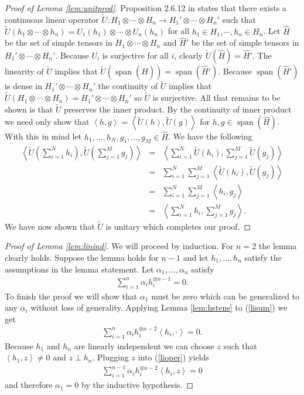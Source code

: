 \documentclass[aos]{imsart}
\def\l{\left}
\def\r{\right}
\def\span{\operatorname{span}}
\def\span{\operatorname{span}}
\theoremstyle{plain}
\theoremstyle{defintion}
\begin{document}
	\begin{proof}[Proof of Lemma \ref{lem:unitprod}]
		Proposition 2.6.12 in \cite{kadison83} states that there exists a continuous linear operator $\tilde{U}:H_1 \otimes \cdots \otimes H_n \to H_1' \otimes \cdots \otimes H_n'$ such that $\tilde{U}\left( h_1 \otimes\cdots \otimes h_n \right) = U_1(h_1) \otimes \cdots \otimes U_n(h_n)$ for all $h_1 \in H_1 ,\cdots, h_n \in H_n$. Let $\widehat{H}$ be the set of simple tensors in $H_1 \otimes \cdots \otimes H_n$ and $\widehat{H}'$ be the set of simple tensors in $H_1'\otimes \cdots \otimes H_n'$. Because $U_i$ is surjective for all $i$, clearly $\tilde{U}(\widehat{H}) = \widehat{H}'$. The linearity of $\tilde{U}$ implies that $\tilde{U}(\span(\widehat{H}))= \span(\widehat{H}')$. Because $\span(\widehat{H}')$ is dense in $H_1'\otimes \cdots \otimes H_n'$ the continuity of $\tilde{U}$ implies that $\tilde{U}(H_1\otimes\cdots \otimes H_n) = H_1'\otimes \cdots \otimes H_n'$ so $\tilde{U}$ is surjective. All that remains to be shown is that $\tilde{U}$ preserves the inner product. By the continuity of inner product we need only show that $\l<h, g\r>=\l<\tilde{U}(h), \tilde{U}(g)\r>$ for $h,g \in \span(\widehat{H})$. With this in mind let $h_1,\ldots, h_N,g_1,\ldots,g_M \in \widehat{H}$. We have the following
		\begin{eqnarray*}
			\l<\tilde{U}\l(\sum_{i=1}^N h_i\r),\tilde{U}\l(\sum_{j=1}^M g_j\r) \r>
			&=& \l<\sum_{i=1}^N \tilde{U}\l(h_i\r),\sum_{j=1}^M \tilde{U}\l(g_j\r) \r>\\
		 &=& \sum_{i=1}^N\sum_{j=1}^M\l< \tilde{U}\l(h_i\r), \tilde{U}\l(g_j\r) \r>\\
		 &=& \sum_{i=1}^N\sum_{j=1}^M\l< h_i, g_j \r>\\
		 &=& \l< \sum_{i=1}^Nh_i, \sum_{j=1}^M g_j \r>.
		\end{eqnarray*}
		We have now shown that $\tilde{U}$ is unitary which completes our proof.
	\end{proof}
	\begin{proof}[Proof of Lemma \ref{lem:linind}]
		We will proceed by induction. For $n=2$ the lemma clearly holds. Suppose the lemma holds for $n-1$ and let $h_1,\ldots, h_n$ satisfy the assumptions in the lemma statement. Let $\alpha_1,\ldots, \alpha_n$ satisfy
		\begin{eqnarray}
			\sum_{i=1}^n \alpha_i h_i^{\otimes n-1}  = 0. \label{lisum}
		\end{eqnarray}
		To finish the proof we will show that $\alpha_1$ must be zero which can be generalized to any $\alpha_i$ without loss of generality.
		Applying Lemma \ref{lem:hstens} to (\ref{lisum}) we get
		\begin{eqnarray}
			\sum_{i=1}^n \alpha_i h_i^{\otimes n-2}  \l<h_i, \cdot \r>  = 0. \label{lioper}
		\end{eqnarray}
		Because $h_1$ and $h_n$ are linearly independent we can choose $z$ such that $\l<h_1,z\r> \neq 0$ and $z\perp h_n$. Plugging $z$ into (\ref{lioper}) yields
		\begin{eqnarray*}
			\sum_{i=1}^{n-1} \alpha_i h_i^{\otimes n-2}\l<h_i, z \r>  = 0 
		\end{eqnarray*}
		and therefore $\alpha_1=0$ by the inductive hypothesis.
	\end{proof}
\end{document}
